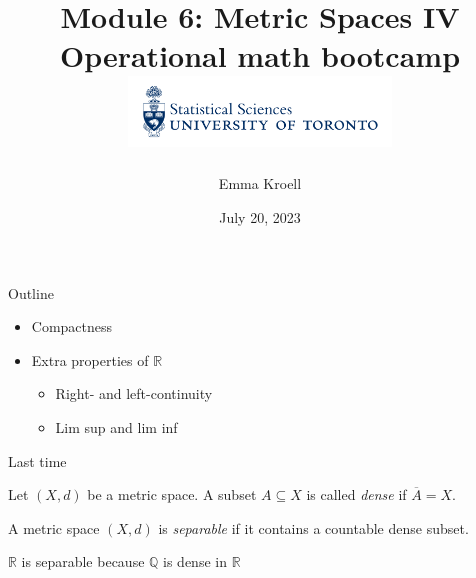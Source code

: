 \documentclass [aspectratio=169]{beamer}
\title[]{Module 6: Metric Spaces IV \\ {\large Operational math bootcamp}\\ \includegraphics[width=7cm]{dept_logo.png}\vspace{-1em}}
\author[]{Emma Kroell}
\institute[]{University of Toronto}
\date{July 20, 2023}
\newcommand{\R}{{\mathbb{R}}}
\newcommand{\Q}{{\mathbb{Q}}}
\begin{document}
{
\begin{frame}
    \titlepage
\end{frame}
}

\begin{frame}{Outline}
    \begin{itemize}
      \setlength\itemsep{1em}
    	\item Compactness
	\item Extra properties of $\R$
	\begin{itemize}
	\setlength\itemsep{0.3em}
	\item Right- and left-continuity
	\item Lim sup and lim inf
	\end{itemize}
    \end{itemize}
\end{frame}



\begin{frame}{Last time}
\begin{definition}
Let $(X,d)$ be a metric space. A subset $A\subseteq X$ is called \emph{dense} if $\overline{A} = X$.
\end{definition}

\vspace{0.5em}

\begin{definition}
A metric space $(X,d)$ is \emph{separable} if it contains a countable dense subset.
\end{definition}

\vspace{0.5em}

\begin{example}
$\R$ is separable because $\Q$ is dense in $\R$
\end{example}


\end{frame}
\end{document}
